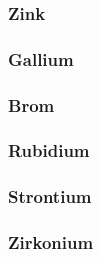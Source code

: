 \subsubsection{Zink}

\subsubsection{Gallium}

\subsubsection{Brom}

\subsubsection{Rubidium}

\subsubsection{Strontium}

\subsubsection{Zirkonium}

